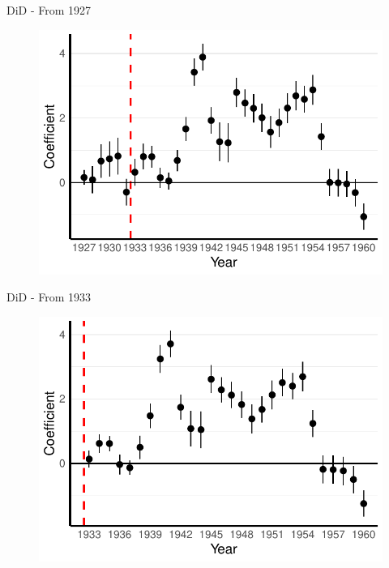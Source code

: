\documentclass[11pt]{beamer}
\begin{document}
\begin{frame}[label=did_from_1927]{DiD - From 1927}
 \begin{figure}[h]
\centering
\includegraphics[width=1\textwidth]{pred_full_imp_date_no_trends_geopol_cr2_base_1927.pdf}
\end{figure}
\hyperlink{robustness_checks}{}
\end{frame}


\begin{frame}[label=did_from_1933]{DiD - From 1933}
 \begin{figure}[h]
\centering
\includegraphics[width=1\textwidth]{pred_full_imp_date_no_trends_geopol_cr2_base_1933.pdf}
\end{figure}
\hyperlink{robustness_checks}{}
\end{frame}
\end{document}
